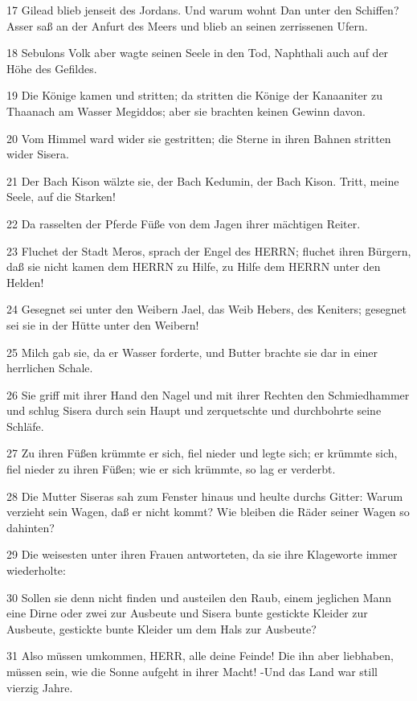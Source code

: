 \par 17 Gilead blieb jenseit des Jordans. Und warum wohnt Dan unter den Schiffen? Asser saß an der Anfurt des Meers und blieb an seinen zerrissenen Ufern.
\par 18 Sebulons Volk aber wagte seinen Seele in den Tod, Naphthali auch auf der Höhe des Gefildes.
\par 19 Die Könige kamen und stritten; da stritten die Könige der Kanaaniter zu Thaanach am Wasser Megiddos; aber sie brachten keinen Gewinn davon.
\par 20 Vom Himmel ward wider sie gestritten; die Sterne in ihren Bahnen stritten wider Sisera.
\par 21 Der Bach Kison wälzte sie, der Bach Kedumin, der Bach Kison. Tritt, meine Seele, auf die Starken!
\par 22 Da rasselten der Pferde Füße von dem Jagen ihrer mächtigen Reiter.
\par 23 Fluchet der Stadt Meros, sprach der Engel des HERRN; fluchet ihren Bürgern, daß sie nicht kamen dem HERRN zu Hilfe, zu Hilfe dem HERRN unter den Helden!
\par 24 Gesegnet sei unter den Weibern Jael, das Weib Hebers, des Keniters; gesegnet sei sie in der Hütte unter den Weibern!
\par 25 Milch gab sie, da er Wasser forderte, und Butter brachte sie dar in einer herrlichen Schale.
\par 26 Sie griff mit ihrer Hand den Nagel und mit ihrer Rechten den Schmiedhammer und schlug Sisera durch sein Haupt und zerquetschte und durchbohrte seine Schläfe.
\par 27 Zu ihren Füßen krümmte er sich, fiel nieder und legte sich; er krümmte sich, fiel nieder zu ihren Füßen; wie er sich krümmte, so lag er verderbt.
\par 28 Die Mutter Siseras sah zum Fenster hinaus und heulte durchs Gitter: Warum verzieht sein Wagen, daß er nicht kommt? Wie bleiben die Räder seiner Wagen so dahinten?
\par 29 Die weisesten unter ihren Frauen antworteten, da sie ihre Klageworte immer wiederholte:
\par 30 Sollen sie denn nicht finden und austeilen den Raub, einem jeglichen Mann eine Dirne oder zwei zur Ausbeute und Sisera bunte gestickte Kleider zur Ausbeute, gestickte bunte Kleider um dem Hals zur Ausbeute?
\par 31 Also müssen umkommen, HERR, alle deine Feinde! Die ihn aber liebhaben, müssen sein, wie die Sonne aufgeht in ihrer Macht! -Und das Land war still vierzig Jahre.

